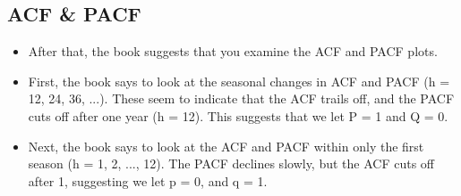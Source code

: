   
  

  
  \subsection{ACF \& PACF}
  \begin{itemize}
  	\item  After that, the book suggests that you examine the ACF and PACF plots.
  	 \item First, the book says to look at the seasonal changes in ACF and PACF (h = 12, 24, 36, ...). These seem to indicate that the ACF trails off, and the PACF cuts off after one year (h = 12). This suggests that we let P = 1 and Q = 0.
  	 \item Next, the book says to look at the ACF and PACF within only the first season (h = 1, 2, ..., 12). The PACF declines slowly, but the ACF cuts off after 1, suggesting we let p = 0, and q = 1.
  \end{itemize}
  

